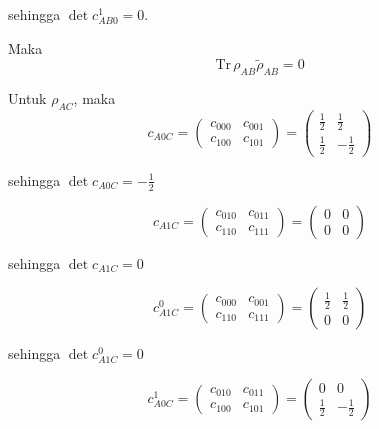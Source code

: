 sehingga $\det c_{AB0}^1 = 0$.

Maka
\begin{equation}
	\mathrm{Tr}\,\rho_{AB}\tilde{\rho}_{AB}=0
\end{equation}

Untuk $\rho_{AC}$, maka
\begin{equation}
	c_{A0C}=
	\begin{pmatrix}
		c_{000} & c_{001} \\
		c_{100} & c_{101}
	\end{pmatrix}=
	\begin{pmatrix}
		\frac{1}{2} & \frac{1}{2} \\
		\frac{1}{2} & -\frac{1}{2}
	\end{pmatrix}
\end{equation}

sehingga $\det c_{A0C} = -\frac{1}{2}$

\begin{equation}
	c_{A1C}=
	\begin{pmatrix}
		c_{010} & c_{011} \\
		c_{110} & c_{111}
	\end{pmatrix}=
	\begin{pmatrix}
		0 & 0 \\
		0 & 0
	\end{pmatrix}
\end{equation}

sehingga $\det c_{A1C} = 0$

\begin{equation}
	c_{A1C}^0=
	\begin{pmatrix}
		c_{000} & c_{001} \\
		c_{110} & c_{111}
	\end{pmatrix}=
	\begin{pmatrix}
		\frac{1}{2} & \frac{1}{2} \\
		0 & 0
	\end{pmatrix}
\end{equation}

sehingga $\det c_{A1C}^0 = 0$

\begin{equation}
	c_{A0C}^1=
	\begin{pmatrix}
		c_{010} & c_{011} \\
		c_{100} & c_{101}
	\end{pmatrix}=
	\begin{pmatrix}
		0 & 0 \\
		\frac{1}{2} & -\frac{1}{2}
	\end{pmatrix}
\end{equation}

